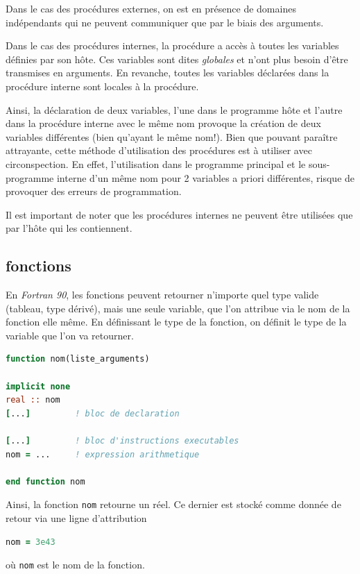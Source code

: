 \documentclass[a4paper,twoside]{article}
\begin{document}
Dans le cas des procédures externes, on est en présence de domaines indépendants qui ne peuvent communiquer que par le biais des arguments. 

Dans le cas des procédures internes, la procédure a accès à toutes les variables définies par son hôte. Ces variables sont dites \emph{globales} et n'ont plus besoin d'être transmises en arguments. En revanche, toutes les variables déclarées dans la procédure interne sont locales à la procédure. 

Ainsi, la déclaration de deux variables, l'une dans le programme hôte et l'autre dans la procédure interne avec le même nom provoque la création de deux variables différentes (bien qu'ayant le même nom!). Bien que pouvant paraître attrayante, cette méthode d'utilisation des procédures est à utiliser avec circonspection. En effet, l'utilisation dans le programme principal et le sous-programme interne d'un même nom pour 2 variables a priori différentes, risque de provoquer des erreurs de programmation. 


\begin{attention}
Il est important de noter que les procédures internes ne peuvent être utilisées que par l'hôte qui les contiennent. 
\end{attention}

\subsection{fonctions}
En \emph{Fortran 90}, les fonctions peuvent retourner n'importe quel type valide (tableau, type dérivé), mais une seule variable, que l'on attribue via le nom de la fonction elle même. En définissant le type de la fonction, on définit le type de la variable que l'on va retourner.

\begin{lstlisting}[language=Fortran]
function nom(liste_arguments)

implicit none 
real :: nom 
[...]         ! bloc de declaration
 
[...]         ! bloc d'instructions executables
nom = ...     ! expression arithmetique

end function nom 
\end{lstlisting}

Ainsi, la fonction \texttt{nom} retourne un réel. Ce dernier est stocké comme donnée de retour via une ligne d'attribution
\begin{lstlisting}[language=Fortran]
nom = 3e43
\end{lstlisting}
où \texttt{nom} est le nom de la fonction.
\end{document}
